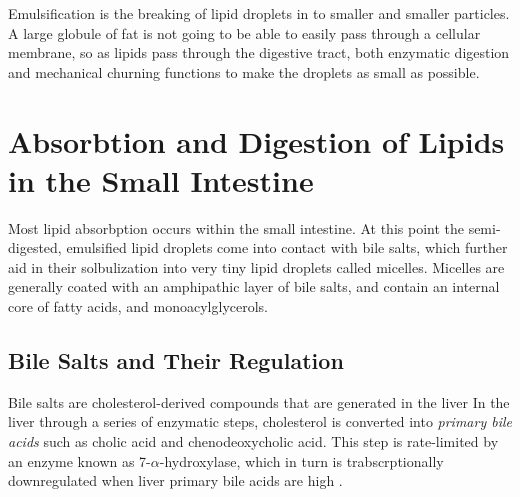 \documentclass{tufte-handout}
\begin{document}
  Emulsification is the breaking of lipid droplets in to smaller and smaller particles.  A large globule of fat is not going to be able to easily pass through a cellular membrane, so as lipids pass through the digestive tract, both enzymatic digestion and mechanical churning functions to make the droplets as small as possible.

\section{Absorbtion and Digestion of Lipids in the Small Intestine}

Most lipid absorbption occurs within the small intestine.  At this point the semi-digested, emulsified lipid droplets come into contact with bile salts, which further aid in their solbulization into very tiny lipid droplets called micelles.  Micelles are generally coated with an amphipathic layer of bile salts, and contain an internal core of fatty acids, and monoacylglycerols.

\subsection{Bile Salts and Their Regulation}

Bile salts are cholesterol-derived compounds that are generated in the liver  In the liver through a series of enzymatic steps, cholesterol is converted into \emph{primary bile acids} such as cholic acid and chenodeoxycholic acid.  This step is rate-limited by an enzyme known as 7-$\alpha$-hydroxylase, which in turn is trabscrptionally downregulated when liver primary bile acids are high \citep{Ramirez1994}.
\end{document}
